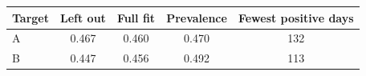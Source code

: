 \begin{tabular}{@{}lcccc@{}}
\toprule
Target & Left out & Full fit & Prevalence & Fewest positive days \\
\midrule
A & 0.467 & 0.460 & 0.470 & 132 \\
B & 0.447 & 0.456 & 0.492 & 113 \\
\bottomrule
\end{tabular}
